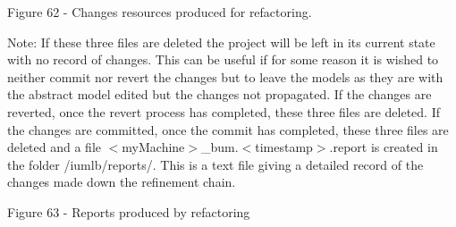 Figure 62 - Changes resources produced for refactoring.

Note: If these three files are deleted the project will be left in its current state with no record of changes. This can be useful if for some reason it is wished to neither commit nor revert the changes but to leave the models as they are with the abstract model edited but the changes not propagated. 
If the changes are reverted, once the revert process has completed, these three files are deleted.
If the changes are committed, once the commit has completed, these three files are deleted and a file $<$myMachine$>$\_bum.$<$timestamp$>$.report is created in the folder /iumlb/reports/. This is a text file giving a detailed record of the changes made down the refinement chain.

Figure 63 - Reports produced by refactoring

